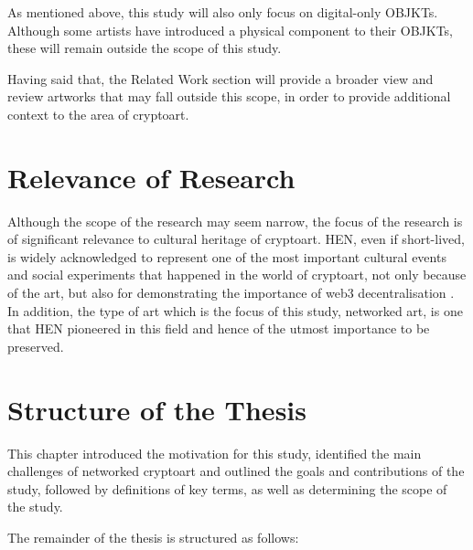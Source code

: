 As mentioned above, this study will also only focus on digital-only OBJKTs. Although some artists have introduced a physical component to their OBJKTs, these will remain outside the scope of this study.

Having said that, the Related Work section will provide a broader view and review artworks that may fall outside this scope, in order to provide additional context to the area of cryptoart.

\section{Relevance of Research}

Although the scope of the research may seem narrow, the focus of the research is of significant relevance to cultural heritage of cryptoart.
HEN, even if short-lived, is widely acknowledged to represent one of the most important cultural events and social experiments that happened in the world of cryptoart, not only because of the art, but also for demonstrating the importance of web3 decentralisation \cite{rcsEarlyDaysHic2023} \cite{baileyHicNuncBrings2021} \cite{drubayHowHicNunc2021}.
In addition, the type of art which is the focus of this study, networked art, is one that HEN pioneered in this field and hence of the utmost importance to be preserved.

\section{Structure of the Thesis}

This chapter introduced the motivation for this study, identified the main challenges of networked cryptoart and outlined the goals and contributions of the study, followed by definitions of key terms, as well as determining the scope of the study.

The remainder of the thesis is structured as follows:


\todo

